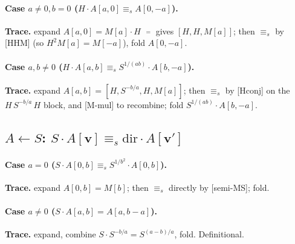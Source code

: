 \documentclass[a4paper]{article}
\newcommand{\lem}[1]{\textsf{[#1]}}      %
\begin{document}
\paragraph{Case $a\neq0,b=0$ \;($H\cdot A[a,0]\equiv_s A[0,-a]$).}
\begin{center}\end{center}
\textbf{Trace.} expand $A[a,0]=M[a]\cdot H$ $\;\overset{=}{\;}\;$ gives $[H,H,M[a]]$; then
$\equiv_s$ by \lem{HHM} (so $H^2M[a]=M[-a]$), fold $A[0,-a]$.

\paragraph{Case $a,b\neq0$ \;($H\cdot A[a,b]\equiv_s S^{1/(ab)}\cdot A[b,-a]$).}
\begin{center}\end{center}
\textbf{Trace.} expand $A[a,b]=[H,S^{-b/a},H,M[a]]$; then $\equiv_s$ by \lem{Hconj}
on the $H\,S^{-b/a}\,H$ block, and \lem{M-mul} to recombine; fold $S^{1/(ab)}\cdot A[b,-a]$.

\subsection{$A\leftarrow S$: \; $S\cdot A[\mathbf v]\equiv_s \mathrm{dir}\cdot A[\mathbf v']$}
\begin{center}\end{center}

\paragraph{Case $a=0$ \;($S\cdot A[0,b]\equiv_s S^{1/b^2}\cdot A[0,b]$).}
\begin{center}\end{center}
\textbf{Trace.} expand $A[0,b]=M[b]$; then $\equiv_s$ directly by \lem{semi-MS}; fold.

\paragraph{Case $a\neq0$ \;($S\cdot A[a,b]=A[a,b-a]$).}
\begin{center}\end{center}
\textbf{Trace.} expand, combine $S\cdot S^{-b/a}=S^{(a-b)/a}$, fold. Definitional.
\end{document}
